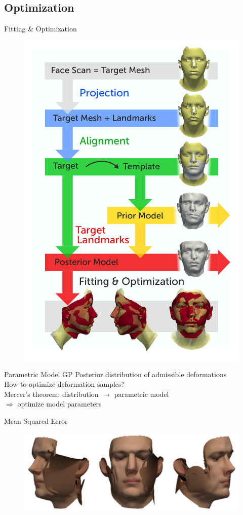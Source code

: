 \documentclass[xcolor=x11names,compress]{beamer}
\begin{document}
\subsection{Optimization}
\begin{frame}{Fitting \& Optimization}
\begin{figure}
    \includegraphics[width=.5\textwidth]{../resources/figures/pipeline.pdf}
\end{figure}
\end{frame}
\begin{frame}{Parametric Model}
    GP Posterior distribution of admissible deformations\\
    How to optimize deformation samples?\\
    \bigskip
    Mercer's theorem: distribution $\rightarrow$ parametric model\\
    $\Rightarrow$ optimize model parameters
\end{frame}

\begin{frame}{Mean Squared Error}
    \begin{figure}
        \centering
        \includegraphics[width=\textwidth]{../resources/img/00029_meansquares_fit.pdf}
    \end{figure}
\end{frame}
\end{document}
